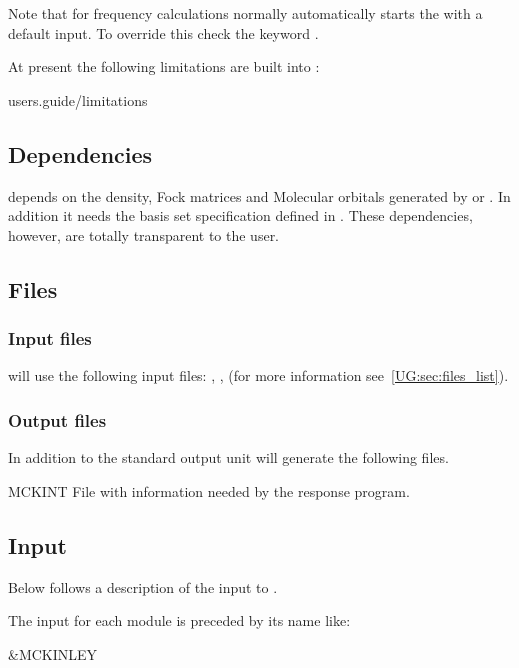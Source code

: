 Note that  for frequency calculations normally automatically
starts the  with a default input. To override this check the
keyword .

At present the following limitations are built into :

 {users.guide/limitations}

\subsection{Dependencies}
\label{UG:sec:mckinley_dependencies}
 depends on the density, Fock matrices and Molecular orbitals generated by
 or . In addition it needs the basis set
specification defined in . These dependencies, however,
are totally transparent to the user.

\subsection{Files}
\label{UG:sec:mckinley_files}
\subsubsection{Input files}
 will use the following input
files: , ,
(for more information see~\ref{UG:sec:files_list}).


\subsubsection{Output files}
In addition to the standard output unit  will generate the following
files.

\begin{filelist}
\item[MCKINT]
File with information needed by the  response program.
\end{filelist}

\subsection{Input}
\label{UG:sec:mckinley_input}
Below follows a description of the input to .

The input for each module is preceded by its name like:
\begin{inputlisting}
 &MCKINLEY
\end{inputlisting}


